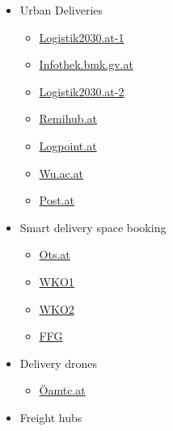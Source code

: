 \documentclass[
]{book}
\providecommand{\tightlist}{%
  \setlength{\itemsep}{0pt}\setlength{\parskip}{0pt}}
\begin{document}
\begin{itemize}
\tightlist
\item
  Urban Deliveries

  \begin{itemize}
  \tightlist
  \item
    \href{https://www.logistik2030.at/?page_id=268}{Logistik2030.at-1}
  \item
    \href{https://infothek.bmk.gv.at/gruene-stadtlogistik-post-testet-city-hubs-in-wien/}{Infothek.bmk.gv.at}
  \item
    \href{https://www.logistik2030.at/?page_id=63}{Logistik2030.at-2}
  \item
    \href{https://www.remihub.at/}{Remihub.at}
  \item
    \href{https://logpoint.at/ueber-uns/gruene-logistikwelt-und-standorte/}{Logpoint.at}
  \item
    \href{https://www.wu.ac.at/scm/projekte/}{Wu.ac.at}
  \item
    \href{https://www.post.at/p/c/vorzimmer-zustellung}{Post.at}
  \end{itemize}
\item
  Smart delivery space booking

  \begin{itemize}
  \tightlist
  \item
    \href{https://www.ots.at/presseaussendung/OTS_20150123_OTS0044/simple-stressfreie-ladezonensuche-wk-wien-praesentiert-neue-app}{Ots.at}
  \item
    \href{https://www.wko.at/service/verkehr-betriebsstandort/Ladezonen-Nutzung.html}{WKO1}
  \item
    \href{https://www.wko.at/service/w/verkehr-betriebsstandort/ladezone-wien-app.html}{WKO2}
  \item
    \href{https://www2.ffg.at/verkehr/projekte.php?id=805\&lang=de\&browse=programm}{FFG}
  \end{itemize}
\item
  Delivery drones

  \begin{itemize}
  \tightlist
  \item
    \href{https://www.oeamtc.at/thema/drohnen/drohnen-info-app-26853120}{Öamtc.at}
  \end{itemize}
\item
  Freight hubs


\end{itemize}
\end{document}
